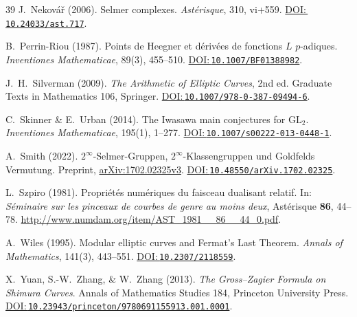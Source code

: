 \documentclass[aps,prd,twocolumn,superscriptaddress,nofootinbib,floatfix]{revtex4-2}
\newcommand{\doilink}[1]{\href{https://doi.org/#1}{DOI:\,\nolinkurl{#1}}}
\theoremstyle{definition}
\theoremstyle{remark}
\begin{document}
\begin{thebibliography}{39}
J.~Nekovář (2006).
Selmer complexes.
\textit{Astérisque}, 310, vi+559.
\doilink{10.24033/ast.717}.

B.~Perrin-Riou (1987).
Points de Heegner et dérivées de fonctions $L$ $p$-adiques.
\textit{Inventiones Mathematicae}, 89(3), 455--510.
\doilink{10.1007/BF01388982}.

J.~H.~Silverman (2009).
\textit{The Arithmetic of Elliptic Curves}, 2nd ed.
Graduate Texts in Mathematics 106, Springer.
\doilink{10.1007/978-0-387-09494-6}.

C.~Skinner \& E.~Urban (2014).
The Iwasawa main conjectures for $\mathrm{GL}_2$.
\textit{Inventiones Mathematicae}, 195(1), 1--277.
\doilink{10.1007/s00222-013-0448-1}.

A.~Smith (2022).
$2^\infty$-Selmer-Gruppen, $2^\infty$-Klassengruppen und Goldfelds Vermutung.
Preprint, \href{https://arxiv.org/abs/1702.02325v3}{arXiv:1702.02325v3}.
\doilink{10.48550/arXiv.1702.02325}.

L.~Szpiro (1981).
Propriétés numériques du faisceau dualisant relatif.
In: \textit{Séminaire sur les pinceaux de courbes de genre au moins deux},
Astérisque \textbf{86}, 44--78.
\url{http://www.numdam.org/item/AST_1981__86__44_0.pdf}.

A.~Wiles (1995).
Modular elliptic curves and Fermat's Last Theorem.
\textit{Annals of Mathematics}, 141(3), 443--551.
\doilink{10.2307/2118559}.

X.~Yuan, S.-W.~Zhang, \& W.~Zhang (2013).
\textit{The Gross--Zagier Formula on Shimura Curves}.
Annals of Mathematics Studies 184, Princeton University Press.
\doilink{10.23943/princeton/9780691155913.001.0001}.

\end{thebibliography}
\end{document}
